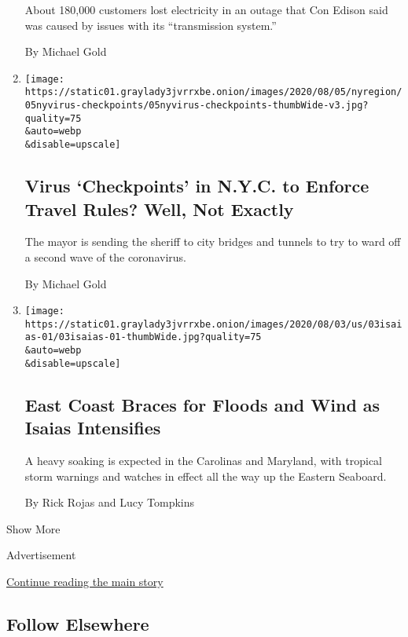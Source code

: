 \begin{enumerate}
  About 180,000 customers lost electricity in an outage that Con Edison
  said was caused by issues with its ``transmission system.''

  By Michael Gold
\item
  \href{/2020/08/05/nyregion/nyc-coronavirus-quarantine-checkpoints.html}{}

  \texttt{[image: https://static01.graylady3jvrrxbe.onion/images/2020/08/05/nyregion/05nyvirus-checkpoints/05nyvirus-checkpoints-thumbWide-v3.jpg?quality=75\\\&auto=webp\\\&disable=upscale]}

  \hypertarget{virus-checkpoints-in-nyc-to-enforce-travel-rules-well-not-exactly}{%
  \subsection{Virus `Checkpoints' in N.Y.C. to Enforce Travel Rules?
  Well, Not
  Exactly}\label{virus-checkpoints-in-nyc-to-enforce-travel-rules-well-not-exactly}}

  The mayor is sending the sheriff to city bridges and tunnels to try to
  ward off a second wave of the coronavirus.

  By Michael Gold
\item
  \href{/2020/08/03/us/isaias-east-coast-landfall.html}{}

  \texttt{[image: https://static01.graylady3jvrrxbe.onion/images/2020/08/03/us/03isaias-01/03isaias-01-thumbWide.jpg?quality=75\\\&auto=webp\\\&disable=upscale]}

  \hypertarget{east-coast-braces-for-floods-and-wind-as-isaias-intensifies}{%
  \subsection{East Coast Braces for Floods and Wind as Isaias
  Intensifies}\label{east-coast-braces-for-floods-and-wind-as-isaias-intensifies}}

  A heavy soaking is expected in the Carolinas and Maryland, with
  tropical storm warnings and watches in effect all the way up the
  Eastern Seaboard.

  By Rick Rojas and Lucy Tompkins
\end{enumerate}

Show More

Advertisement

\protect\hyperlink{after-mid2}{Continue reading the main story}

\hypertarget{follow-elsewhere}{%
\subsection{Follow Elsewhere}\label{follow-elsewhere}}

